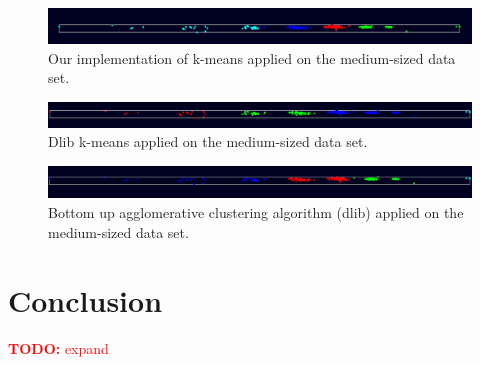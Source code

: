 \documentclass[journal]{vgtc}       %
\newcommand{\todo}[1]{\textcolor{red}{\textbf{TODO:} #1}}
\begin{document}
\begin{figure}[h!]
	\begin{center}
		\includegraphics[width=.75\linewidth]{k-Means-mediumDataSet.png}
	\end{center}
	\caption{\label{fig:kmeans} Our implementation of k-means applied on the medium-sized data set.}
\end{figure} 
\begin{figure}[h!]
	\begin{center}
		\includegraphics[width=.75\linewidth]{k-Means-dlib-mediumDataSet.png}
	\end{center}
	\caption{\label{fig:kmeans-dlib} Dlib k-means applied on the medium-sized data set.}
\end{figure}
\begin{figure}[h!]
	\begin{center}
		\includegraphics[width=.75\linewidth]{bottomUpAgglomerative-mediumDataSet.png}
	\end{center}
	\caption{\label{fig:bottomUpAgglomerative} Bottom up agglomerative clustering algorithm (dlib) applied on the medium-sized data set.}
\end{figure}


\section{Conclusion}
\todo{expand}




\end{document}
